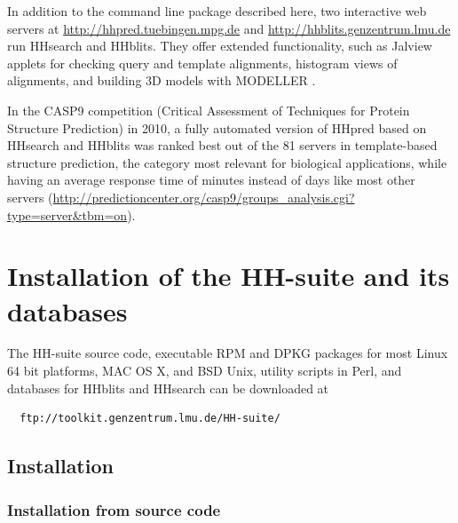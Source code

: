 \documentclass[11pt,a4paper]{article}
\begin{document}
In addition to the command line package described here, two interactive web servers at \url{http://hhpred.tuebingen.mpg.de} \cite{Soding:2005b, Hildebrand:2009} and \url{http://hhblits.genzentrum.lmu.de} run HHsearch and HHblits. They offer extended functionality, such as Jalview applets for checking query and template alignments, histogram views of alignments, and building 3D models with MODELLER \cite{Sali:1993}. 

In the CASP9 competition (Critical Assessment of Techniques for Protein Structure Prediction) in 2010, a fully automated version of HHpred based on HHsearch and HHblits was ranked best out of the 81 servers in template-based structure prediction, the category most relevant for biological applications, while having an average response time of minutes instead of days like most other servers \cite{Mariani:2011} (\url{http://predictioncenter.org/casp9/groups_analysis.cgi?type=server&tbm=on}). 

\section{Installation of the HH-suite and its databases}

The HH-suite source code, executable RPM and DPKG packages for most Linux 64 bit platforms, MAC OS X, and BSD Unix, utility scripts in Perl, and databases for HHblits and HHsearch can be downloaded at
\begin{verbatim}
  ftp://toolkit.genzentrum.lmu.de/HH-suite/
\end{verbatim}


\subsection{Installation} \label{installation}

\subsubsection*{Installation from source code} 

\end{document}
